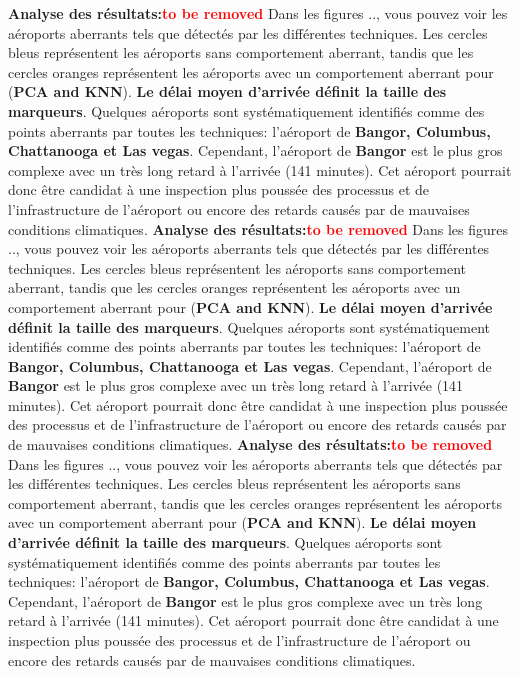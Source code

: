 \noindent\textbf{Analyse des résultats:\textcolor{red}{to be removed}} 
Dans les figures .., vous pouvez voir les aéroports aberrants tels que détectés par les différentes techniques. Les cercles bleus représentent les aéroports sans comportement aberrant, tandis que les cercles oranges représentent les aéroports avec un comportement aberrant pour (\textbf{PCA and KNN}). \textbf{Le délai moyen d'arrivée définit la taille des marqueurs}. Quelques aéroports sont systématiquement identifiés comme des points aberrants par toutes les techniques: l’aéroport de \textbf{Bangor, Columbus, Chattanooga et Las vegas}. Cependant, l’aéroport de \textbf{Bangor} est le plus gros complexe avec un très long retard à l’arrivée (141 minutes). Cet aéroport pourrait donc être candidat à une inspection plus poussée des processus et de l’infrastructure de l’aéroport ou encore des retards causés par de mauvaises conditions climatiques.
\noindent\textbf{Analyse des résultats:\textcolor{red}{to be removed}} 
Dans les figures .., vous pouvez voir les aéroports aberrants tels que détectés par les différentes techniques. Les cercles bleus représentent les aéroports sans comportement aberrant, tandis que les cercles oranges représentent les aéroports avec un comportement aberrant pour (\textbf{PCA and KNN}). \textbf{Le délai moyen d'arrivée définit la taille des marqueurs}. Quelques aéroports sont systématiquement identifiés comme des points aberrants par toutes les techniques: l’aéroport de \textbf{Bangor, Columbus, Chattanooga et Las vegas}. Cependant, l’aéroport de \textbf{Bangor} est le plus gros complexe avec un très long retard à l’arrivée (141 minutes). Cet aéroport pourrait donc être candidat à une inspection plus poussée des processus et de l’infrastructure de l’aéroport ou encore des retards causés par de mauvaises conditions climatiques.
\noindent\textbf{Analyse des résultats:\textcolor{red}{to be removed}} 
Dans les figures .., vous pouvez voir les aéroports aberrants tels que détectés par les différentes techniques. Les cercles bleus représentent les aéroports sans comportement aberrant, tandis que les cercles oranges représentent les aéroports avec un comportement aberrant pour (\textbf{PCA and KNN}). \textbf{Le délai moyen d'arrivée définit la taille des marqueurs}. Quelques aéroports sont systématiquement identifiés comme des points aberrants par toutes les techniques: l’aéroport de \textbf{Bangor, Columbus, Chattanooga et Las vegas}. Cependant, l’aéroport de \textbf{Bangor} est le plus gros complexe avec un très long retard à l’arrivée (141 minutes). Cet aéroport pourrait donc être candidat à une inspection plus poussée des processus et de l’infrastructure de l’aéroport ou encore des retards causés par de mauvaises conditions climatiques.
